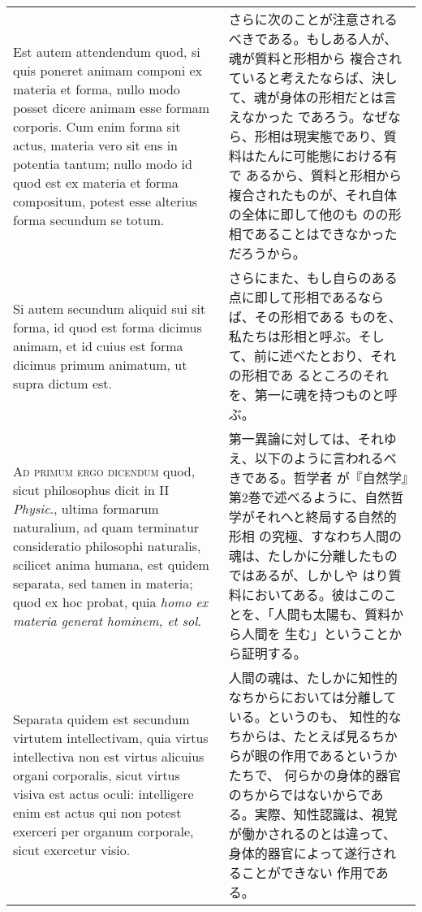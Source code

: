 \documentclass[paper=a4paper,fontsize=10pt,jafontsize=9pt,titlepage]{jlreq}
\begin{document}
\begin{longtable}{p{21em}p{21em}}
 Est autem attendendum quod, si quis poneret animam componi ex materia
 et forma, nullo modo posset dicere animam esse formam corporis. Cum
 enim forma sit actus, materia vero sit ens in potentia tantum; nullo
 modo id quod est ex materia et forma compositum, potest esse alterius
 forma secundum se totum.

 
&

さらに次のことが注意されるべきである。もしある人が、魂が質料と形相から
複合されていると考えたならば、決して、魂が身体の形相だとは言えなかった
であろう。なぜなら、形相は現実態であり、質料はたんに可能態における有で
あるから、質料と形相から複合されたものが、それ自体の全体に即して他のも
のの形相であることはできなかっただろうから。
 
 
\\


 Si autem secundum aliquid sui sit forma, id quod est forma dicimus
 animam, et id cuius est forma dicimus primum animatum, ut supra
 dictum est.
 
&

 さらにまた、もし自らのある点に即して形相であるならば、その形相である
 ものを、私たちは形相と呼ぶ。そして、前に述べたとおり、それの形相であ
 るところのそれを、第一に魂を持つものと呼ぶ。

 
\\

 {\scshape Ad primum ergo dicendum} quod, sicut philosophus dicit in
 II {\itshape Physic}., ultima formarum naturalium, ad quam terminatur
 consideratio philosophi naturalis, scilicet anima humana, est quidem
 separata, sed tamen in materia; quod ex hoc probat, quia {\itshape
 homo ex materia generat hominem, et sol}.

 &

 第一異論に対しては、それゆえ、以下のように言われるべきである。哲学者
 が『自然学』第2巻で述べるように、自然哲学がそれへと終局する自然的形相
 の究極、すなわち人間の魂は、たしかに分離したものではあるが、しかしや
 はり質料においてある。彼はこのことを、「人間も太陽も、質料から人間を
 生む」ということから証明する。

 \\


 Separata quidem est secundum virtutem intellectivam, quia virtus
 intellectiva non est virtus alicuius organi corporalis, sicut virtus
 visiva est actus oculi: intelligere enim est actus qui non potest
 exerceri per organum corporale, sicut exercetur visio.

 &

 人間の魂は、たしかに知性的なちからにおいては分離している。というのも、
 知性的なちからは、たとえば見るちからが眼の作用であるというかたちで、
 何らかの身体的器官のちからではないからである。実際、知性認識は、視覚
 が働かされるのとは違って、身体的器官によって遂行されることができない
 作用である。


\end{longtable}
\end{document}
